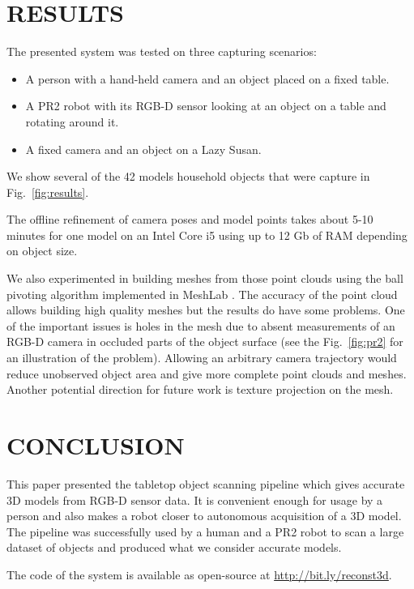 \documentclass[letterpaper, 10 pt, conference]{ieeeconf}  %
\begin{document}
\section{RESULTS}

\label{sec:experiments}

The presented system was tested on three capturing scenarios:

\begin{itemize}
 \item A person with a hand-held camera and an object placed on a fixed table.
 \item A PR2 robot with its RGB-D sensor looking at an object on a table and rotating around it.
 \item A fixed camera and an object on a Lazy Susan.
\end{itemize}

We show several of the 42 models household objects that were capture in Fig.~\ref{fig:results}.

The offline refinement of camera poses 
and model points takes about 5-10 minutes for one model on an Intel Core i5 using up to 12 Gb of RAM
depending on object size.

We also experimented in building meshes from those point clouds using 
the ball pivoting algorithm \cite{bernardini1999ball}
implemented in MeshLab \cite{meshlab}. The accuracy of 
the point cloud allows building high quality meshes but the results do have some problems. One of the important issues 
is holes in 
the mesh due to absent measurements of an RGB-D camera in occluded parts of the object surface 
(see the Fig.~\ref{fig:pr2} for an illustration of the problem).
Allowing an arbitrary camera 
trajectory would reduce unobserved object area and give more complete
point clouds and meshes. Another potential direction for future work is texture projection on the mesh.


\section{CONCLUSION}

This paper presented the tabletop object scanning pipeline
which gives accurate 3D models from RGB-D sensor data.
It is convenient enough for usage by a person and also makes a robot closer
to autonomous acquisition of a 3D model. The pipeline 
was successfully used by a human and a PR2 robot 
to scan a large dataset of objects and produced what we consider
accurate models.

The code of the system is available as open-source at
\href{http://bit.ly/reconst3d}{http://bit.ly/reconst3d}.
\end{document}
